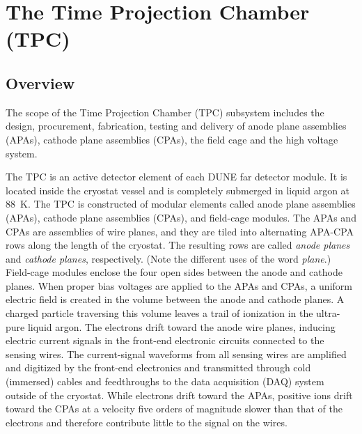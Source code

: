 
\section{The Time Projection Chamber (TPC)} 
\label{sec:detectors-fd-ref-tpc}

\subsection{Overview}

The scope of the Time Projection Chamber (TPC) subsystem includes the
design, procurement, fabrication, testing and delivery of anode plane
assemblies (APAs), cathode plane assemblies (CPAs), the field cage and
the high voltage system.

The TPC is an active detector element of each DUNE
far detector module. It is located inside the cryostat vessel and is
completely submerged in liquid argon at 88~K. 
The TPC is constructed of modular elements called
 anode plane assemblies (APAs),  cathode plane assemblies
(CPAs), and field-cage modules. The APAs and CPAs are assemblies of
wire planes, and they are tiled into alternating APA-CPA rows along the length of
the cryostat. The resulting rows are called \textit{anode planes} and \textit{cathode planes}, respectively.
(Note the different uses of the word \textit{plane}.)  Field-cage modules enclose the four open sides between
the anode and cathode planes.  
%
When proper bias voltages are applied
to the APAs and CPAs, a uniform electric field is created in the volume
between the anode and cathode planes. A charged particle traversing
this volume leaves a trail of ionization in the ultra-pure liquid
argon.  The electrons drift toward the anode wire planes, inducing
electric current signals in the front-end electronic circuits
connected to the sensing wires.  The current-signal waveforms from all
sensing wires are amplified and digitized by the front-end electronics
and transmitted through cold (immersed) cables and feedthroughs to the data
acquisition (DAQ) system outside of the cryostat. While electrons drift
toward the APAs, positive ions drift toward the CPAs at a velocity five orders of 
magnitude slower than that of the electrons and therefore contribute little to the signal on the wires.  




